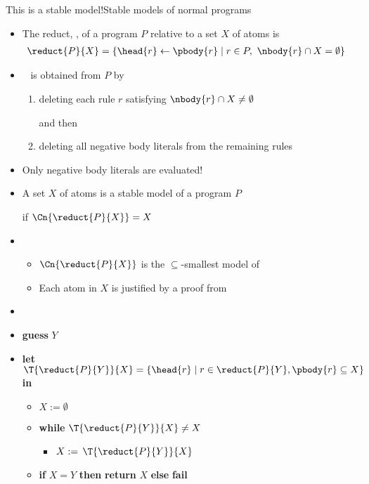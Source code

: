 \begin{frame}{This is a stable model!}{Stable models of normal programs}

  \begin{itemize}
  \item <2-10> The \alert{reduct}, , of a program $P$ relative to
    a set $X$ of atoms is
    \begin{align*}
      \reduct{P}{X} &= \{\head{r}\leftarrow\pbody{r} \mid r\in P,\ \nbody{r}\cap X=\emptyset\}
    \end{align*}

  \item<only@3-4>  \  is obtained from $P$ by
    \begin{enumerate}\normalsize
    \item deleting each rule $r$ satisfying $\nbody{r}\cap X\neq\emptyset$

      and then

    \item deleting all negative body literals from the remaining rules
    \end{enumerate}
  \item<only@4>[] Only negative body literals are evaluated!

  \item <only@6-> A set $X$ of atoms is a \alert{stable model} of a program $P$

    if $\Cn{\reduct{P}{X}}=X$

    \smallskip

  \item<only@7> 
    \begin{itemize}\normalsize
    \item $\Cn{\reduct{P}{X}}$ is the $\subseteq$-smallest model of 
      \smallskip
    \item Each atom in $X$ is justified by a proof from 
    \end{itemize}

  \item<only@8-9> 

  \item<only@9> []\small \textbf{guess} $Y$
  \item<only@9> []\small \textbf{let} $\T{\reduct{P}{Y}}{X}=\{\head{r}\mid r\in \reduct{P}{Y}, \pbody{r}\subseteq X\}$ \textbf{in}
    \begin{itemize}
    \item []$X := \emptyset$
      \smallskip
    \item []\textbf{while} {$\T{\reduct{P}{Y}}{X}\neq X$}
      \begin{itemize}\small
      \item[] $X := {\,\T{\reduct{P}{Y}}{X}}$
      \end{itemize}
    \item[]\small \textbf{if} $X=Y$ \textbf{then} \textbf{return} $X$ \textbf{else} \textbf{fail}
    \end{itemize}

  \end{itemize}
\end{frame}
%
